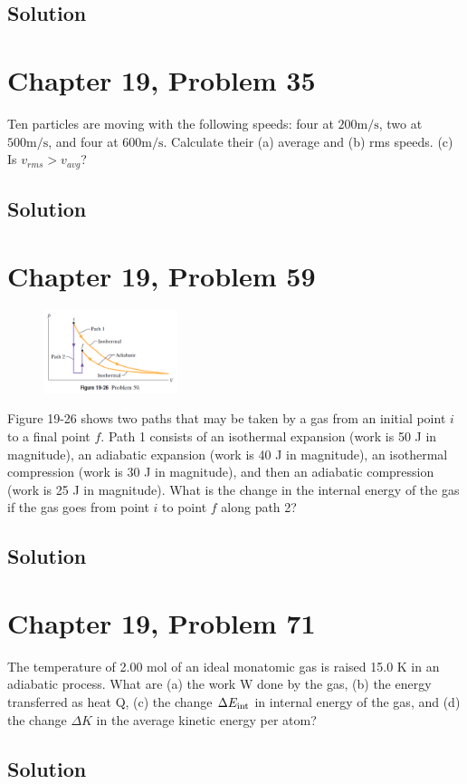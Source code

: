 \documentclass{article}
\begin{document}
        \subsection{Solution}
    
    \pagebreak
    \section{Chapter 19, Problem 35}
        Ten particles are moving with the following speeds: four at $200 \unit{\meter/\second}$, two at $500 \unit{\meter/\second}$, and four at $600 \unit{\meter/\second}$. 
        Calculate their (a) average and (b) rms speeds. 
        (c) Is $v_{rms} > v_{avg}$?

        \subsection{Solution}

    \pagebreak
    \section{Chapter 19, Problem 59}
        \begin{figure}
            \vspace{-30pt}
            \includegraphics[width=0.35\textwidth]{picture_19-26.png} 
        \end{figure}
        Figure 19-26 shows two paths that may be taken by a gas from an initial point $i$ to a final point $f$. 
        Path 1 consists of an isothermal expansion (work is 50 J in magnitude), an adiabatic expansion (work is 40 J in magnitude), an isothermal compression (work is 30 J in magnitude), and then an adiabatic compression (work is 25 J in magnitude). 
        What is the change in the internal energy of the gas if the gas goes from point $i$ to point $f$ along path 2?

        \subsection{Solution}
    
    \pagebreak
    \section{Chapter 19, Problem 71}
        The temperature of 2.00 mol of an ideal monatomic gas is raised 15.0 K in an adiabatic process. 
        What are (a) the work W done by the gas, (b) the energy transferred as heat Q, (c) the change $\Delta E_{\rm int}$ in internal energy of the gas, and (d) the change $\Delta K$ in the average kinetic energy per atom?

        \subsection{Solution}
\end{document}
